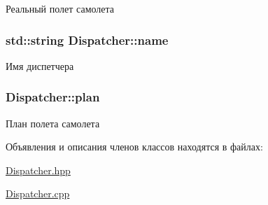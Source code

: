 Реальный полет самолета 

\subsubsection[{\texorpdfstring{name}{name}}]{\setlength{\rightskip}{0pt plus 5cm}std\+::string Dispatcher\+::name\hspace{0.3cm}{\ttfamily [private]}}\hypertarget{class_dispatcher_aa0667608304c6859a6dea2f16d8b56e7}{}\label{class_dispatcher_aa0667608304c6859a6dea2f16d8b56e7}


Имя диспетчера 

\subsubsection[{\texorpdfstring{plan}{plan}}]{ Dispatcher\+::plan\hspace{0.3cm}{\ttfamily [private]}}\hypertarget{class_dispatcher_acd061344a58a854e72c08712e9ef8b7e}{}\label{class_dispatcher_acd061344a58a854e72c08712e9ef8b7e}


План полета самолета 



Объявления и описания членов классов находятся в файлах\+:\begin{DoxyCompactItemize}
\item 
\hyperlink{_dispatcher_8hpp}{Dispatcher.\+hpp}\item 
\hyperlink{_dispatcher_8cpp}{Dispatcher.\+cpp}\end{DoxyCompactItemize}
